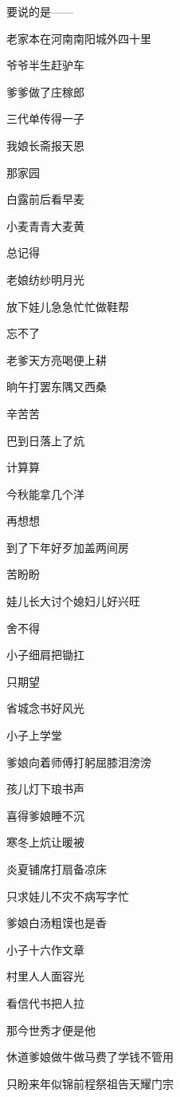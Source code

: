 \par 要说的是——
\par 老家本在河南南阳城外四十里
\par 爷爷半生赶驴车
\par 爹爹做了庄稼郎
\par 三代单传得一子
\par 我娘长斋报天恩
\par 
\par 那家园
\par 白露前后看早麦
\par 小麦青青大麦黄
\par 总记得
\par 老娘纺纱明月光
\par 放下娃儿急急忙忙做鞋帮
\par 忘不了
\par 老爹天方亮喝便上耕
\par 晌午打罢东隅又西桑
\par 辛苦苦
\par 巴到日落上了炕
\par 计算算
\par 今秋能拿几个洋
\par 再想想
\par 到了下年好歹加盖两间房
\par 苦盼盼
\par 娃儿长大讨个媳妇儿好兴旺
\par 舍不得
\par 小子细肩把锄扛
\par 只期望
\par 省城念书好风光
\par 
\par 小子上学堂
\par 爹娘向着师傅打躬屈膝泪滂滂
\par 孩儿灯下琅书声
\par 喜得爹娘睡不沉
\par 寒冬上炕让暖被
\par 炎夏铺席打扇备凉床
\par 只求娃儿不灾不病写字忙
\par 爹娘白汤粗馍也是香
\par 
\par 小子十六作文章
\par 村里人人面容光
\par 看信代书把人拉
\par 那今世秀才便是他
\par 休道爹娘做牛做马费了学钱不管用
\par 只盼来年似锦前程祭祖告天耀门宗
